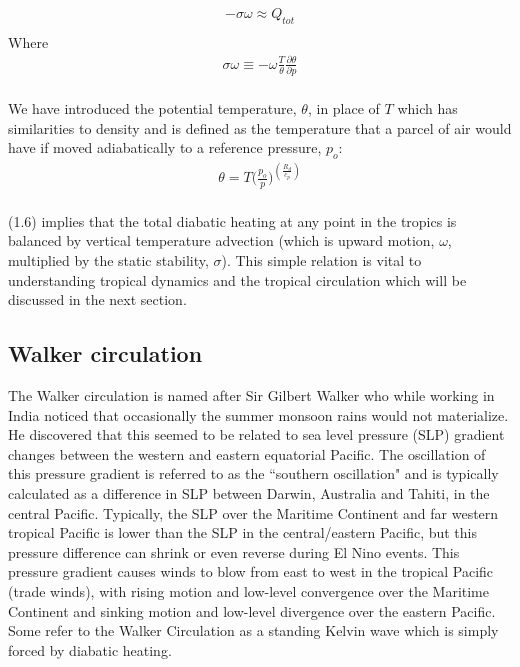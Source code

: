 \documentclass[letterpaper,12pt,titlepage,oneside,final]{book}
\begin{document}
\begin{align}
-\sigma\omega \approx{Q_{tot}}
\\
\end{align}
Where
\begin{align}
  \sigma\omega\equiv-\omega\frac{T}{\theta}\frac{\partial{\theta}}{\partial{p}}
\end{align}
\\
We have introduced the potential temperature, $\theta$, in place of $T$ which has similarities to density and is defined as the temperature that a parcel of air would have if moved adiabatically to a reference pressure, $p_{o}$:
\begin{align}
\theta=T\Big(\frac{p_{o}}{p}\Big)^{(\frac{R_{d}}{c_{p}})}
\end{align}
\\
(1.6) implies that the total diabatic heating at any point in the tropics is balanced by vertical temperature advection (which is upward motion, $\omega$, multiplied by the static stability, $\sigma$).
This simple relation is vital to understanding tropical dynamics and the tropical circulation which will be discussed in the next section.

\subsection{Walker circulation}

The Walker circulation is named after Sir Gilbert Walker who while working in India noticed that occasionally the summer monsoon rains would not materialize. He discovered that this seemed to be related to sea level pressure (SLP) gradient changes between the western and eastern equatorial Pacific. The oscillation of this pressure gradient is referred to as the ``southern oscillation" and is typically calculated as a difference in SLP between Darwin, Australia and Tahiti, in the central Pacific. Typically, the SLP over the Maritime Continent and far western tropical Pacific is lower than the SLP in the central/eastern Pacific, but this pressure difference can shrink or even reverse during El Nino events. This pressure gradient causes winds to blow from east to west in the tropical Pacific (trade winds), with rising motion and low-level convergence over the Maritime Continent and sinking motion and low-level divergence over the eastern Pacific. Some refer to the Walker Circulation as a standing Kelvin wave which is simply forced by diabatic heating.
\end{document}
